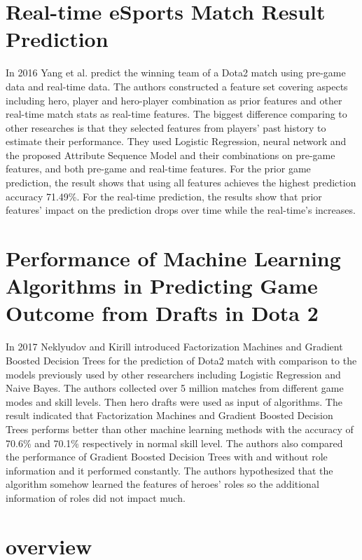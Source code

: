 \documentclass[12pt,openany,a4paper]{book}
\begin{document}
\section{Real-time eSports Match Result Prediction}
In 2016 Yang et al.\cite{yang2016real} predict the winning team of a Dota2 match using pre-game data and real-time data. The authors constructed a feature set covering aspects including hero, player and hero-player combination as prior features and other real-time match stats as real-time features. The biggest difference comparing to other researches is that they selected features from players' past history to estimate their performance. They used Logistic Regression, neural network and the proposed Attribute Sequence Model and their combinations on pre-game features, and both pre-game and real-time features. For the prior game prediction, the result shows that using all features achieves the highest prediction accuracy 71.49\%. For the real-time prediction, the results show that prior features' impact on the prediction drops over time while the real-time's increases. \\

\section{Performance of Machine Learning Algorithms in Predicting Game Outcome from Drafts in Dota 2}
In 2017 Neklyudov and Kirill\cite{neklyudov2017performance} introduced Factorization Machines and Gradient Boosted Decision Trees for the prediction of Dota2 match with comparison to the models previously used by other researchers including Logistic Regression and Naive Bayes. The authors collected over 5 million matches from different game modes and skill levels. Then hero drafts were used as input of algorithms. The result indicated that Factorization Machines and Gradient Boosted Decision Trees performs better than other machine learning methods with the accuracy of 70.6\% and 70.1\% respectively in normal skill level. The authors also compared the performance of Gradient Boosted Decision Trees with and without role information and it performed constantly. The authors hypothesized that the algorithm somehow learned the features of heroes' roles so the additional information of roles did not impact much.

\section{overview}
\end{document}
